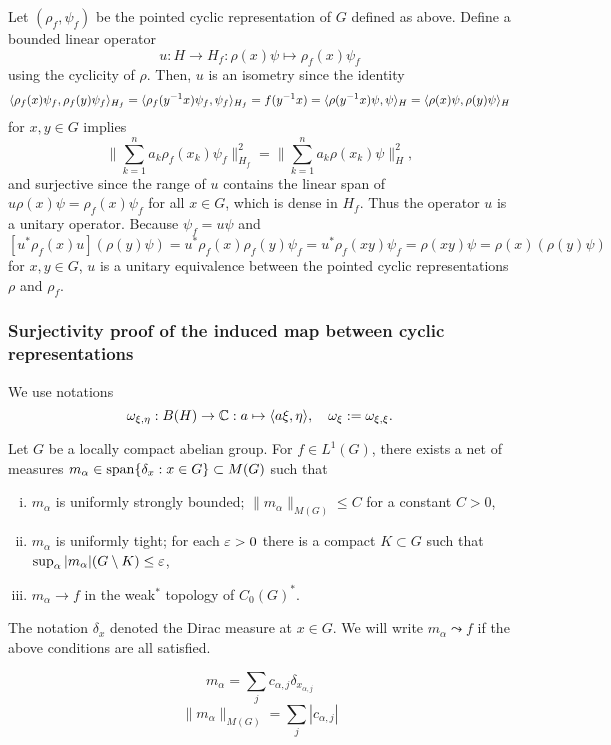 \documentclass{../../small}
\begin{document}
\begin{pf}
Let $(\rho_f,\psi_f)$ be the pointed cyclic representation of $G$ defined as above.
Define a bounded linear operator
\[u:H\to H_f:\rho(x)\psi\mapsto\rho_f(x)\psi_f\]
using the cyclicity of $\rho$.
Then, $u$ is an isometry since the identity
\[\langle\rho_f(x)\psi_f,\rho_f(y)\psi_f\rangle_{H_f}=\langle\rho_f(y^{-1}x)\psi_f,\psi_f\rangle_{H_f}=f(y^{-1}x)=\langle\rho(y^{-1}x)\psi,\psi\rangle_H=\langle\rho(x)\psi,\rho(y)\psi\rangle_H\]
for $x,y\in G$ implies
\[\|\sum_{k=1}^na_k\rho_f(x_k)\psi_f\|_{H_f}^2=\|\sum_{k=1}^na_k\rho(x_k)\psi\|_H^2,\]
and surjective since the range of $u$ contains the linear span of $u\rho(x)\psi=\rho_f(x)\psi_f$ for all $x\in G$, which is dense in $H_f$.
Thus the operator $u$ is a unitary operator.
Because $\psi_f=u\psi$ and
\[[u^*\rho_f(x)u](\rho(y)\psi)=u^*\rho_f(x)\rho_f(y)\psi_f=u^*\rho_f(xy)\psi_f=\rho(xy)\psi=\rho(x)(\rho(y)\psi)\]
for $x,y\in G$, $u$ is a unitary equivalence between the pointed cyclic representations $\rho$ and $\rho_f$.
\end{pf}


\iffalse

\subsubsection*{Surjectivity proof of the induced map between cyclic representations}

We use notations
\[\omega_{\xi,\eta}:B(H)\to\mathbb{C}:a\mapsto\langle a\xi,\eta\rangle,\quad\omega_\xi:=\omega_{\xi,\xi}.\]

\begin{lem}
Let $G$ be a locally compact abelian group.
For $f\in L^1(G)$, there exists a net of measures $m_\alpha\in\operatorname{span}\{\delta_x:x\in G\}\subset M(G)$ such that
\begin{enumerate}[(i)]
\item $m_\alpha$ is uniformly strongly bounded; $\|m_\alpha\|_{M(G)}\le C$ for a constant $C>0$,
\item $m_\alpha$ is uniformly tight; for each $\varepsilon>0$ there is a compact $K\subset G$ such that $\sup_\alpha|m_\alpha|(G\setminus K)\le\varepsilon$,
\item $m_\alpha\to f$ in the weak$^*$ topology of $C_0(G)^*$.
\end{enumerate}
The notation $\delta_x$ denoted the Dirac measure at $x\in G$.
We will write $m_\alpha\leadsto f$ if the above conditions are all satisfied.
\end{lem}
\begin{pf}
\[m_\alpha=\sum_jc_{\alpha,j}\delta_{x_{\alpha,j}}\]
\[\|m_\alpha\|_{M(G)}=\sum_j|c_{\alpha,j}|\]
\end{pf}
\end{document}
